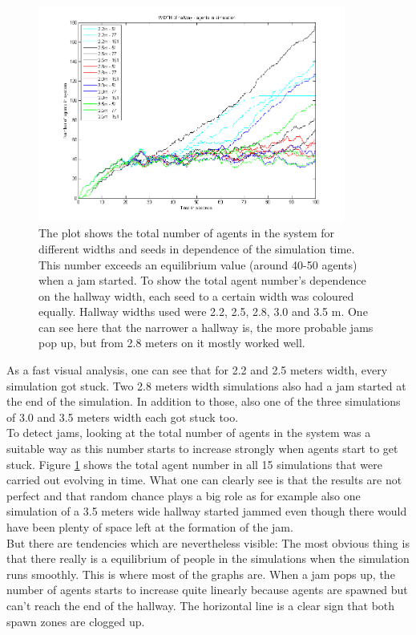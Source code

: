 
\begin{figure}[h!]
	\centering
		\includegraphics[width=0.90\textwidth]{pictures/AallInOne.png}
	\caption{The plot shows the total number of agents in the system for different widths and seeds in dependence of the simulation time. This number exceeds an equilibrium value (around 40-50 agents) when a jam started. To show the total agent number's dependence on the hallway width, each seed to a certain width was coloured equally. Hallway widths used were 2.2, 2.5, 2.8, 3.0 and 3.5 m. One can see here that the narrower a hallway is, the more probable jams pop up, but from 2.8 meters on it mostly worked well.}
	\label{fig:WidthAllInOne}
\end{figure}

\noi As a fast visual analysis, one can see that for 2.2 and 2.5 meters width, every simulation got stuck. Two 2.8 meters width simulations also had a jam started at the end of the simulation. In addition to those, also one of the three simulations of 3.0 and 3.5 meters width each got stuck too.\\

\noi To detect jams, looking at the total number of agents in the system was a suitable way as this number starts to increase strongly when agents start to get stuck. Figure \ref{fig:WidthAllInOne} shows the total agent number in all 15 simulations that were carried out evolving in time. What one can clearly see is that the results are not perfect and that random chance plays a big role as for example also one simulation of a 3.5 meters wide hallway started jammed even though there would have been plenty of space left at the formation of the jam.\\
But there are tendencies which are nevertheless visible: The most obvious thing is that there really is a equilibrium of people in the simulations when the simulation runs smoothly. This is where most of the graphs are. When a jam pops up, the number of agents starts to increase quite linearly because agents are spawned but can't reach the end of the hallway. The horizontal line is a clear sign that both spawn zones are clogged up.\\

